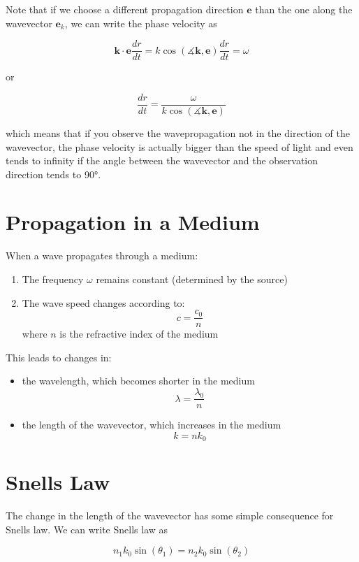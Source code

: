 \documentclass[
  a4paper,
]{book}
\providecommand{\tightlist}{%
  \setlength{\itemsep}{0pt}\setlength{\parskip}{0pt}}
\begin{document}
Note that if we choose a different propagation direction \(\mathbf{e}\)
than the one along the wavevector \(\mathbf{e}_k\), we can write the
phase velocity as

\[
\mathbf{k}\cdot\mathbf{e} \frac{dr}{dt}=k\cos(\measuredangle\mathbf{k},\mathbf{e}) \frac{dr}{dt}=\omega
\]

or

\[
\frac{dr}{dt}=\frac{\omega}{k\cos(\measuredangle\mathbf{k},\mathbf{e})}
\]

which means that if you observe the wavepropagation not in the direction
of the wavevector, the phase velocity is actually bigger than the speed
of light and even tends to infinity if the angle between the wavevector
and the observation direction tends to 90°.

\section{Propagation in a Medium}\label{propagation-in-a-medium}

When a wave propagates through a medium:

\begin{enumerate}
\def\labelenumi{\arabic{enumi}.}
\tightlist
\item
  The frequency \(\omega\) remains constant (determined by the source)
\item
  The wave speed changes according to: \[
  c=\frac{c_0}{n}
  \] where \(n\) is the refractive index of the medium
\end{enumerate}

This leads to changes in:

\begin{itemize}
\item
  the wavelength, which becomes shorter in the medium \[
  \lambda=\frac{\lambda_0}{n}
  \]
\item
  the length of the wavevector, which increases in the medium \[
  k=nk_0
  \]
\end{itemize}

\section{Snells Law}\label{snells-law-1}

The change in the length of the wavevector has some simple consequence
for Snells law. We can write Snells law as

\[
n_1k_0\sin(\theta_1)=n_2k_0\sin(\theta_2)
\]
\end{document}
